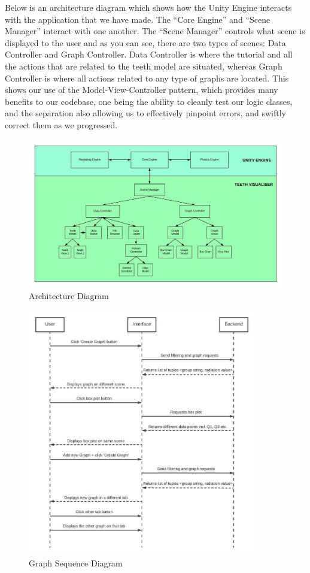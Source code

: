 \documentclass[11pt,english, titlepage]{article}
\begin{document}
      Below is an architecture diagram which shows how the Unity Engine interacts with the application that we have made. The ``Core Engine'' and ``Scene Manager'' interact with one another. The ``Scene Manager'' controls what scene is displayed to the user and as you can see, there are two types of scenes: Data Controller and Graph Controller. Data Controller is where the tutorial and all the actions that are related to the teeth model are situated, whereas Graph Controller is where all actions related to any type of graphs are located. This shows our use of the Model-View-Controller pattern, which provides many benefits to our codebase, one being the ability to cleanly test our logic classes, and the separation also allowing us to effectively pinpoint errors, and swiftly correct them as we progressed.\\


      \begin{figure}[H]
        \includegraphics[width=\linewidth]{architecture}
        \caption{Architecture Diagram}
        \label{fig:architecture}
      \end{figure}

      \begin{figure}[H]
        \begin{center}
        \includegraphics[width=100mm,scale=0.5]{graphsequence}
        \caption{Graph Sequence Diagram}
        \label{fig:graphsequence}
        \end{center}
      \end{figure}
\end{document}
